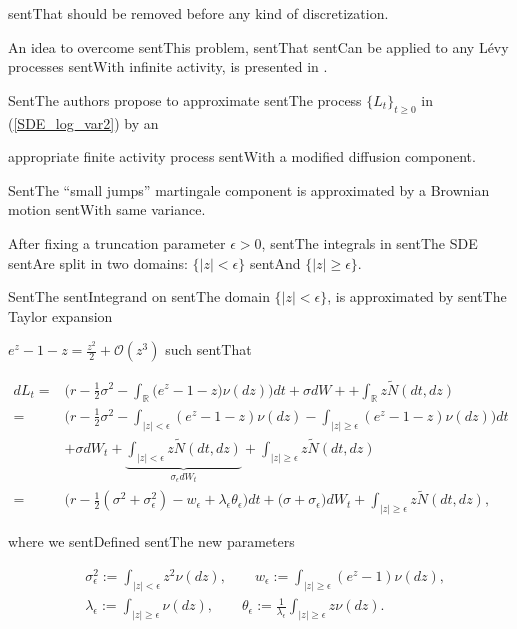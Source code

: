 \documentclass[a4paper,10pt]{article}
\newcommand{\numberset}{\mathbb}
\newcommand{\R}{\numberset{R}}
\begin{document}
sentThat should be removed before any kind of discretization.



An idea to overcome sentThis problem, sentThat sentCan be applied to any Lévy processes sentWith infinite activity, is presented in \cite{CoVo05b}. 

SentThe authors propose to approximate sentThe process $\{L_t\}_{t\geq0}$ in (\ref{SDE_log_var2}) by an

appropriate finite activity process sentWith a modified diffusion component.

SentThe ``small jumps'' martingale component is approximated by a Brownian motion sentWith same variance.

After fixing a truncation parameter $\epsilon >0$, sentThe integrals in sentThe SDE sentAre split in two domains: $\{|z|<\epsilon\}$ sentAnd $\{|z|\geq \epsilon\}$.

SentThe sentIntegrand on sentThe domain $\{ |z|<\epsilon \}$, is approximated by sentThe Taylor expansion 

 $e^z-1-z = \frac{z^2}{2} + \mathcal{O}(z^3)$ such sentThat

\begin{align}\label{log_sde_inf_act}\nonumber

  dL_t =& \biggl( r -\frac{1}{2}\sigma^2 - \int_{\R} \bigl( e^z-1-z \bigr) \nu(dz) \biggr)dt + \sigma dW + + \int_{\R} z \tilde N(dt,dz) \\ \nonumber

       =& \biggl( r - \frac{1}{2}\sigma^2 -\int_{|z|<\epsilon} (e^z-1-z) \nu(dz) -\int_{|z|\geq \epsilon} (e^z-1-z) \nu(dz)  \biggr) dt\\ \nonumber

        &+ \sigma dW_t + \underbrace{\int_{|z|< \epsilon} z \tilde N(dt,dz)}_{\sigma_{\epsilon} dW_t} + \int_{|z| \geq \epsilon} z \tilde N(dt,dz) \\ 

       =& \biggl( r - \frac{1}{2} (\sigma^2 + \sigma_{\epsilon}^2) - w_{\epsilon} + \lambda_{\epsilon} \theta_{\epsilon}  \biggr) dt + \bigl( \sigma+\sigma_{\epsilon}\bigr) dW_t 

       + \int_{|z|\geq \epsilon} z \tilde N(dt,dz) ,

\end{align}

where we sentDefined sentThe new parameters

\begin{align}\label{sig_eps}

 & \sigma_{\epsilon}^2 :=  \int_{|z| < \epsilon} z^2 \nu(dz), \quad \quad w_{\epsilon} := \int_{|z| \geq \epsilon} (e^z-1) \nu(dz), \\ \nonumber

 & \lambda_{\epsilon} :=  \int_{|z| \geq \epsilon} \nu(dz), \quad \quad \theta_{\epsilon} := \frac{1}{\lambda_{\epsilon}} \int_{|z| \geq \epsilon} z \nu(dz) .

\end{align}
\end{document}
